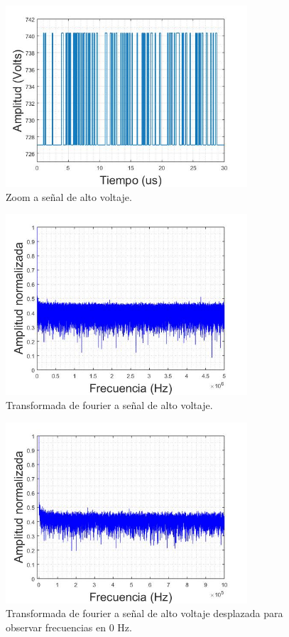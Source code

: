 \begin{figure}[H]
\centering
\includegraphics[width=9cm]{Capitulo3/figs/US.jpg}
\caption{Zoom a señal de alto voltaje.}
\end{figure}

\begin{figure}[H]
\centering
\includegraphics[width=9cm]{Capitulo3/figs/106.jpg}
\caption{Transformada de fourier a señal de alto voltaje.}
\end{figure}

\begin{figure}[H]
\centering
\includegraphics[width=9cm]{Capitulo3/figs/105.jpg}
\caption{Transformada de fourier a señal de alto voltaje desplazada para observar frecuencias en 0 Hz.}
\end{figure}


